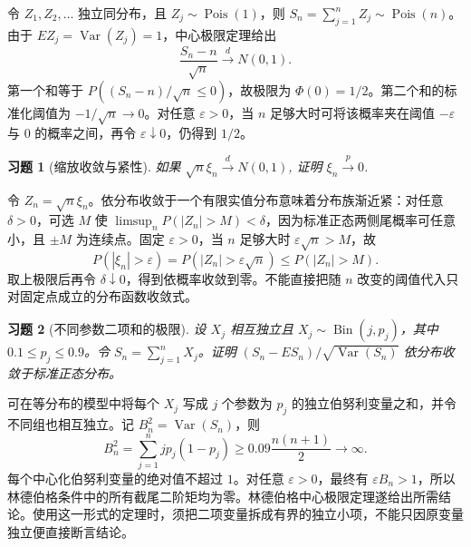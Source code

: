 \documentclass[12pt,fontset=fandol]{ctexart}
\newtheorem{exercise}{习题}[section]
\begin{document}
\begin{solve}\label{a:A7.20}令 $Z_1,Z_2,\ldots$ 独立同分布，且 $Z_j\sim\operatorname{Pois}(1)$，则 $S_n=\sum_{j=1}^nZ_j\sim\operatorname{Pois}(n)$。由于 $EZ_j=\operatorname{Var}(Z_j)=1$，中心极限定理给出\[\frac{S_n-n}{\sqrt n}\xrightarrow{d}N(0,1).\]第一个和等于 $P((S_n-n)/\sqrt n\le0)$，故极限为 $\Phi(0)=1/2$。第二个和的标准化阈值为 $-1/\sqrt n\to0$。对任意 $\varepsilon>0$，当 $n$ 足够大时可将该概率夹在阈值 $-\varepsilon$ 与 $0$ 的概率之间，再令 $\varepsilon\downarrow0$，仍得到 $1/2$。\end{solve}

\begin{exercise}[缩放收敛与紧性]\label{q:A7.21}
如果 $\sqrt{n}\xi_n\xrightarrow{d}N(0,1)$, 证明 $\xi_n\xrightarrow{p}0$.\par{}
\end{exercise}

\begin{solve}\label{a:A7.21}令 $Z_n=\sqrt n\xi_n$。依分布收敛于一个有限实值分布意味着分布族渐近紧：对任意 $\delta>0$，可选 $M$ 使 $\limsup_nP(|Z_n|>M)<\delta$，因为标准正态两侧尾概率可任意小，且 $\pm M$ 为连续点。固定 $\varepsilon>0$，当 $n$ 足够大时 $\varepsilon\sqrt n>M$，故\[P(|\xi_n|>\varepsilon)=P(|Z_n|>\varepsilon\sqrt n)\le P(|Z_n|>M).\]取上极限后再令 $\delta\downarrow0$，得到依概率收敛到零。不能直接把随 $n$ 改变的阈值代入只对固定点成立的分布函数收敛式。\end{solve}

\begin{exercise}[不同参数二项和的极限]\label{q:A7.22}
设 $X_j$ 相互独立且 $X_j\sim\operatorname{Bin}(j,p_j)$，其中 $0.1\le p_j\le0.9$。令 $S_n=\sum_{j=1}^nX_j$。证明 $(S_n-ES_n)/\sqrt{\operatorname{Var}(S_n)}$ 依分布收敛于标准正态分布。\par{}
\end{exercise}

\begin{solve}\label{a:A7.22}可在等分布的模型中将每个 $X_j$ 写成 $j$ 个参数为 $p_j$ 的独立伯努利变量之和，并令不同组也相互独立。记 $B_n^2=\operatorname{Var}(S_n)$，则\[B_n^2=\sum_{j=1}^n jp_j(1-p_j)\ge0.09\frac{n(n+1)}2\longrightarrow\infty.\]每个中心化伯努利变量的绝对值不超过 $1$。对任意 $\varepsilon>0$，最终有 $\varepsilon B_n>1$，所以林德伯格条件中的所有截尾二阶矩均为零。林德伯格中心极限定理遂给出所需结论。使用这一形式的定理时，须把二项变量拆成有界的独立小项，不能只因原变量独立便直接断言结论。\end{solve}
\end{document}

